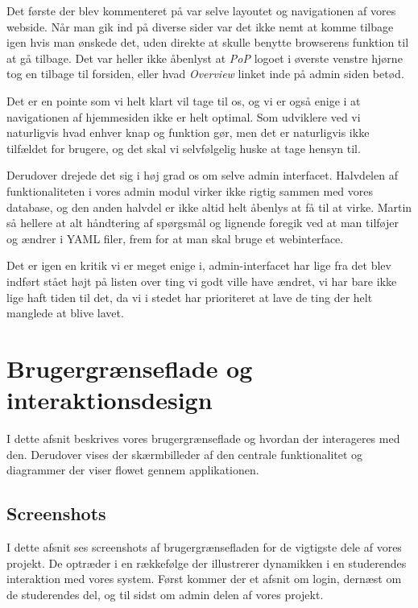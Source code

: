 \documentclass[11pt, a4paper]{article}
\begin{document}
Det første der blev kommenteret på var selve layoutet og navigationen af vores webside. Når man gik ind på diverse sider var det ikke nemt at komme tilbage igen hvis man ønskede det, uden direkte at skulle benytte browserens funktion til at gå tilbage. Det var heller ikke åbenlyst at \emph{PoP} logoet i øverste venstre hjørne tog en tilbage til forsiden, eller hvad \emph{Overview} linket inde på admin siden betød.

Det er en pointe som vi helt klart vil tage til os, og vi er også enige i at navigationen af hjemmesiden ikke er helt optimal. Som udviklere ved vi naturligvis hvad enhver knap og funktion gør, men det er naturligvis ikke tilfældet for brugere, og det skal vi selvfølgelig huske at tage hensyn til.

Derudover drejede det sig i høj grad os om selve admin interfacet. Halvdelen af funktionaliteten i vores admin modul virker ikke rigtig sammen med vores database, og den anden halvdel er ikke altid helt åbenlys at få til at virke. Martin så hellere at alt håndtering af spørgsmål og lignende foregik ved at man tilføjer og ændrer i YAML filer, frem for at man skal bruge et webinterface.

Det er igen en kritik vi er meget enige i, admin-interfacet har lige fra det blev indført stået højt på listen over ting vi godt ville have ændret, vi har bare ikke lige haft tiden til det, da vi i stedet har prioriteret at lave de ting der helt manglede at blive lavet.

\section{Brugergrænseflade og interaktionsdesign}
\label{sec:userinterface}

I dette afsnit beskrives vores brugergrænseflade og hvordan der interageres med den. Derudover vises der skærmbilleder af den centrale funktionalitet og diagrammer der viser flowet gennem applikationen.

\subsection{Screenshots}
\label{sub:screenshots}
I dette afsnit ses screenshots af brugergrænsefladen for de vigtigste dele af vores projekt. De optræder i en rækkefølge der illustrerer dynamikken i en studerendes interaktion med vores system. Først kommer der et afsnit om login, dernæst om de studerendes del, og til sidst om admin delen af vores projekt.
\end{document}
